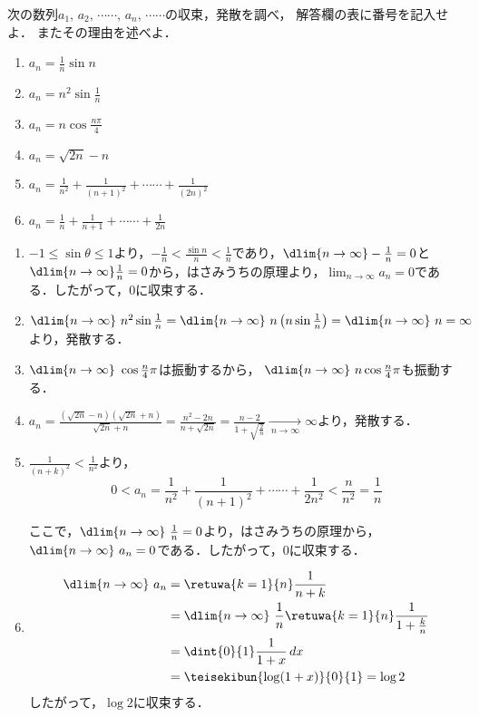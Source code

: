 \begin{problem}
  次の数列$a_1, \, a_2, \, \cdots\cdots, \, a_n, \, \cdots\cdots$の収束，発散を調べ，
解答欄の表に番号を記入せよ．
またその理由を述べよ．
\begin{enumerate}
\item $\displaystyle a_n=\frac{1}{n}\sin n$
\item $\displaystyle a_n=n^2\sin\frac{1}{n}$
\item $\displaystyle a_n=n\cos\frac{n\pi}{4}$
\item $a_n=\sqrt{2n}-n$
\item $\displaystyle a_n=\frac{1}{n^2}+\frac{1}{{(n+1)}^2}+\cdots\cdots+\frac{1}{{(2n)}^2}$
\item $\displaystyle a_n=\frac{1}{n}+\frac{1}{n+1}+\cdots\cdots+\frac{1}{2n}$
\end{enumerate}
\end{problem}


\begin{enumerate}
  \item $-1 \leq \sin\theta \leq 1$より，$-\frac{1}{n} < \frac{\sin n}{n} < \frac{1}{n}$であり，$\dlim{n \to \infty} -\frac{1}{n} = 0$と$\dlim{n \to \infty} \frac{1}{n} = 0$から，はさみうちの原理より，$\lim_{n\to\infty}a_n = 0$である．したがって，$0$に収束する．

  \item
  $\dlim{n \to \infty}\ n^2 \sin \frac{1}{n}
    = \dlim{n \to \infty}\ n\left(n\sin \frac{1}{n}\right)
    = \dlim{n \to \infty}\ n
    = \infty$
  より，発散する．

  \item $\dlim{n \to \infty}\ \cos\frac{n}{4}\pi$は振動するから，
  $\dlim{n\to\infty}\ n\cos\frac{n}{4}\pi$も振動する．

  \item $a_n = \frac{(\sqrt{2n}-n)(\sqrt{2n}+n)}{\sqrt{2n}+n}
  = \frac{n^2-2n}{n+\sqrt{2n}}=\frac{n-2}{1+\sqrt{\frac{2}{n}}}\underset{\ n \to \infty\ }{\longrightarrow} \infty$より，発散する．

  \item $\frac{1}{(n+k)^2} < \frac{1}{n^2}$より，
  \[0 < a_n = \frac{1}{n^2} + \frac{1}{(n+1)^2} + \cdots\cdots + \frac{1}{2n^2} < \frac{n}{n^2} = \frac{1}{n}\]

  ここで，$\dlim{n\to\infty}\ \frac{1}{n} = 0$より，はさみうちの原理から，
  $\dlim{n\to\infty}\ a_n = 0$である．したがって，0に収束する．

  \item
  \begin{align*}
    \dlim{n\to\infty}\ a_n &= \retuwa{k=1}{n}\frac{1}{n+k} \\
    &= \dlim{n\to\infty}\ \frac{1}{n} \retuwa{k=1}{n}\frac{1}{1+\frac{k}{n}}\\
    &= \dint{0}{1}\frac{1}{1+x}\, dx\\
    &= \teisekibun{\log (1+x)}{0}{1} = \log 2
  \end{align*}
  したがって，$\log 2$に収束する．
\end{enumerate}
